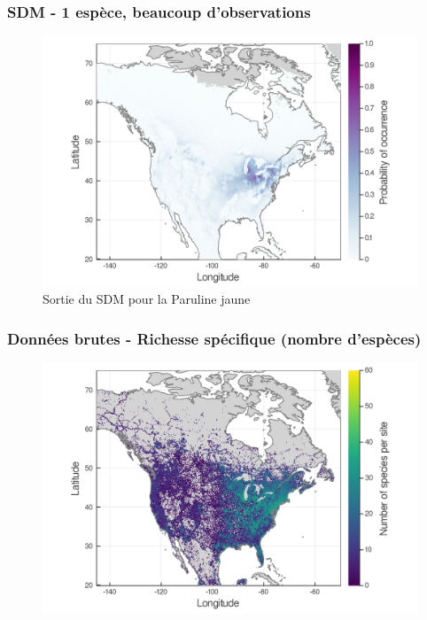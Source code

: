 \documentclass[10pt]{beamer}
\begin{document}
\begin{frame}
  \frametitle{SDM - 1 espèce, beaucoup d'observations}
  \begin{figure}
    \centering
    \hspace*{-0cm}\includegraphics[scale=0.17]{fig/01_sdm_singlesp.png}
    \caption{Sortie du SDM pour la Paruline jaune}
  \end{figure}
\end{frame}

\begin{frame}
  \frametitle{Données brutes - Richesse spécifique (nombre d'espèces)}
  \begin{figure}
    \centering
    \hspace*{-0cm}\includegraphics[scale=0.17]{fig/03_raw_richness.png}
  \end{figure}
\end{frame}
\end{document}
